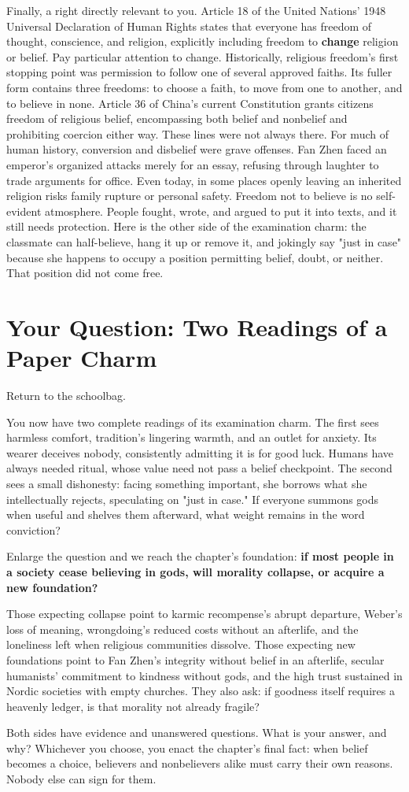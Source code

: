 Finally, a right directly relevant to you. Article 18 of the United Nations' 1948 Universal Declaration of Human Rights states that everyone has freedom of thought, conscience, and religion, explicitly including freedom to \textbf{change} religion or belief. Pay particular attention to change. Historically, religious freedom's first stopping point was permission to follow one of several approved faiths. Its fuller form contains three freedoms: to choose a faith, to move from one to another, and to believe in none. Article 36 of China's current Constitution grants citizens freedom of religious belief, encompassing both belief and nonbelief and prohibiting coercion either way. These lines were not always there. For much of human history, conversion and disbelief were grave offenses. Fan Zhen faced an emperor's organized attacks merely for an essay, refusing through laughter to trade arguments for office. Even today, in some places openly leaving an inherited religion risks family rupture or personal safety. Freedom not to believe is no self-evident atmosphere. People fought, wrote, and argued to put it into texts, and it still needs protection. Here is the other side of the examination charm: the classmate can half-believe, hang it up or remove it, and jokingly say "just in case" because she happens to occupy a position permitting belief, doubt, or neither. That position did not come free.

\section{Your Question: Two Readings of a Paper Charm}
Return to the schoolbag.

You now have two complete readings of its examination charm. The first sees harmless comfort, tradition's lingering warmth, and an outlet for anxiety. Its wearer deceives nobody, consistently admitting it is for good luck. Humans have always needed ritual, whose value need not pass a belief checkpoint. The second sees a small dishonesty: facing something important, she borrows what she intellectually rejects, speculating on "just in case." If everyone summons gods when useful and shelves them afterward, what weight remains in the word conviction?

Enlarge the question and we reach the chapter's foundation: \textbf{if most people in a society cease believing in gods, will morality collapse, or acquire a new foundation?}

Those expecting collapse point to karmic recompense's abrupt departure, Weber's loss of meaning, wrongdoing's reduced costs without an afterlife, and the loneliness left when religious communities dissolve. Those expecting new foundations point to Fan Zhen's integrity without belief in an afterlife, secular humanists' commitment to kindness without gods, and the high trust sustained in Nordic societies with empty churches. They also ask: if goodness itself requires a heavenly ledger, is that morality not already fragile?

Both sides have evidence and unanswered questions. What is your answer, and why? Whichever you choose, you enact the chapter's final fact: when belief becomes a choice, believers and nonbelievers alike must carry their own reasons. Nobody else can sign for them.
